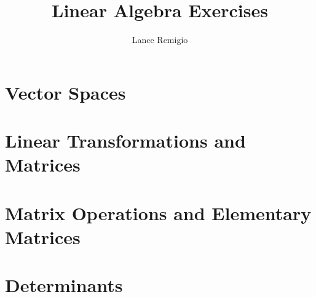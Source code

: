 \documentclass[11pt, a4paper]{book}
\title{Linear Algebra Exercises}
\author{Lance Remigio}
\begin{document}
\tableofcontents
\maketitle 

\chapter{Vector Spaces}











\chapter{Linear Transformations and Matrices}











\chapter{Matrix Operations and Elementary Matrices}



\chapter{Determinants}




\end{document}
